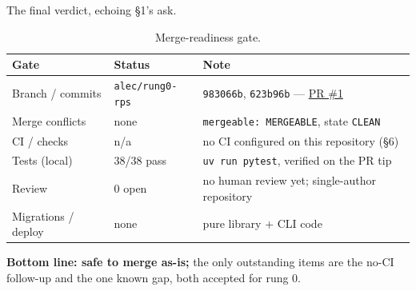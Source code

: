 \documentclass[11pt]{article}
\begin{document}
\noindent The final verdict, echoing \S1's ask.

\begin{table}[H]
\centering\small
\caption{Merge-readiness gate.}
\renewcommand{\arraystretch}{1.25}
\begin{tabular}{@{}p{4.0cm}p{3.4cm}p{5.6cm}@{}}
\toprule
Gate & Status & Note \\
\midrule
Branch / commits & \texttt{alec/rung0-rps} & \texttt{983066b}, \texttt{623b96b} --- \href{https://github.com/AlecROndo/drawmaha-solver/pull/1}{PR \#1} \\
Merge conflicts  & none & \texttt{mergeable: MERGEABLE}, state \texttt{CLEAN} \\
CI / checks      & n/a & no CI configured on this repository (\S6) \\
Tests (local)    & 38/38 pass & \texttt{uv run pytest}, verified on the PR tip \\
Review           & 0 open & no human review yet; single-author repository \\
Migrations / deploy & none & pure library + CLI code \\
\bottomrule
\end{tabular}
\end{table}

\noindent\textbf{Bottom line: safe to merge as-is;} the only outstanding items
are the no-CI follow-up and the one known gap, both accepted for rung 0.
\end{document}
